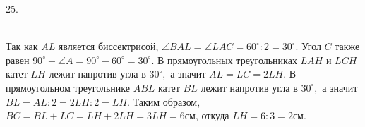 25. \begin{figure}[ht!]
\end{figure}\\
Так как $AL$ является биссектрисой, $\angle BAL=\angle LAC=60^\circ:2=30^\circ.$ Угол $C$ также равен $90^\circ-\angle A=90^\circ-60^\circ=30^\circ.$ В прямоугольных треугольниках $LAH$ и $LCH$ катет $LH$ лежит напротив угла в $30^\circ,$ а значит $AL=LC=2LH.$ В прямоугольном треугольнике $ABL$ катет $BL$ лежит напротив угла
в $30^\circ,$ а значит $BL=AL:2=2LH:2=LH.$ Таким образом, $BC=BL+LC=LH+2LH=3LH=6$см, откуда $LH=6:3=2$см.\newpage\noindent
